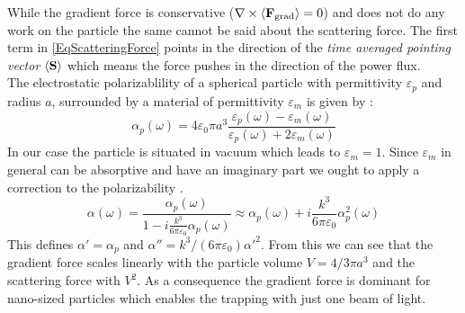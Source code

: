 While the gradient force is conservative ($\nabla\times\av{\field{F}{grad}}=0$) and does not do any work on the particle the same cannot be said about the scattering force. The first term in \autoref{EqScatteringForce} points in the direction of the \textit{time averaged pointing vector} $\av{\vc{S}}$ which means the force pushes in the direction of the power flux.\\
The electrostatic polarizablility of a spherical particle with permittivity $\varepsilon_{\si{p}}$ and radius $a$, surrounded by a material of permittivity $\varepsilon_{\si{m}}$ is given by \cite[p.~463]{novotny2012principles}:
\begin{equation}
	\alpha_{\si{p}}(\omega)=4\varepsilon_0\pi a^3\frac{\varepsilon_{\si{p}}(\omega)-\varepsilon_{\si{m}}(\omega)}{\varepsilon_{\si{p}}(\omega)+2\varepsilon_{\si{m}}(\omega)}
\end{equation}
In our case the particle is situated in vacuum which leads to $\varepsilon_{\si{m}}=1$. Since $\varepsilon_{\si{m}}$ in general can be absorptive and have an imaginary part we ought to apply a correction to the polarizability \cite[p.~19]{hebestreit2017thermal}.
\begin{equation}\label{EqPolarizability}
	\alpha(\omega)=\frac{\alpha_{\si{p}}(\omega)}{1-i\frac{k^3}{6\pi\varepsilon_0}\alpha_{\si{p}}(\omega)}\approx\alpha_{\si{p}}(\omega)+i\frac{k^3}{6\pi\varepsilon_0}\alpha_{\si{p}}^2(\omega)
\end{equation}
This defines $\alpha'=\alpha_{\si{p}}$ and $\alpha''=k^3/(6\pi\varepsilon_0)\alpha'^2$. From this we can see that the gradient force scales linearly with the particle volume $V=4/3\pi a^3$ and the scattering force with $V^2$. As a consequence the gradient force is dominant for nano-sized particles which enables the trapping with just one beam of light.


